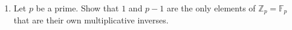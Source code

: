 \documentclass[12pt]{article}
\newcommand{\FF}{{\mathbb F}}
\newcommand{\ZZ}{{\mathbb Z}}
\begin{document}
\begin{enumerate}

 \item  Let $p$ be a prime.
   Show that $1$ and $p-1$ are the only elements of $\ZZ_p=\FF_p$ that are their own multiplicative inverses.

 




\end{enumerate}
\end{document}
